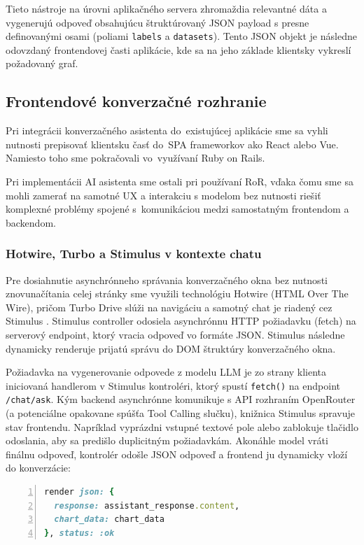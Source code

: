 Tieto nástroje na úrovni aplikačného servera zhromaždia relevantné dáta a vygenerujú
odpoveď obsahujúcu štruktúrovaný JSON payload s presne definovanými osami (poliami
\texttt{labels} a \texttt{datasets}). Tento JSON objekt je následne odovzdaný
frontendovej časti aplikácie, kde sa na jeho základe klientsky vykreslí požadovaný
graf.

\subsection{Frontendové konverzačné rozhranie}
Pri integrácii konverzačného asistenta do~existujúcej aplikácie sme sa vyhli nutnosti
prepisovať klientsku časť do~SPA frameworkov ako React alebo Vue. Namiesto toho
sme pokračovali vo~využívaní Ruby on Rails.

Pri implementácii AI asistenta sme ostali pri používaní RoR, vďaka čomu sme sa mohli
zamerať na samotné UX a interakciu s modelom bez nutnosti riešiť komplexné problémy
spojené s~komunikáciou medzi samostatným frontendom a backendom.

\subsubsection{Hotwire, Turbo a Stimulus v kontexte chatu}
Pre dosiahnutie asynchrónneho správania konverzačného okna bez nutnosti znovunačítania
celej stránky sme využili technológiu Hotwire (HTML Over The Wire), pričom Turbo
Drive slúži na navigáciu a samotný chat je riadený cez Stimulus \cite{ruby2025}. Stimulus
controller odosiela asynchrónnu HTTP požiadavku (fetch) na serverový endpoint,
ktorý vracia odpoveď vo formáte JSON. Stimulus následne dynamicky renderuje prijatú
správu do DOM štruktúry konverzačného okna.

Požiadavka na vygenerovanie odpovede z modelu LLM je zo strany klienta iniciovaná
handlerom v Stimulus kontroléri, ktorý spustí \texttt{fetch()} na endpoint \texttt{/chat/ask}.
Kým backend asynchrónne komunikuje s API rozhraním OpenRouter (a potenciálne
opakovane spúšťa Tool Calling slučku), knižnica Stimulus spravuje stav frontendu.
Napríklad vyprázdni vstupné textové pole alebo zablokuje tlačidlo odoslania, aby
sa predišlo duplicitným požiadavkám. Akonáhle model vráti finálnu odpoveď,
kontrolér odošle JSON odpoveď a frontend ju dynamicky vloží do konverzácie:

\vspace{1\baselineskip}
\begin{lstlisting}[language=Ruby,
    caption={Odoslanie JSON odpovede z API},
    label={lst:json_response},
    basicstyle=\ttfamily\small,
    keywordstyle=\color{blue},
    commentstyle=\color{gray},
    stringstyle=\color{red!70!black},
    numbers=left,
    numberstyle=\tiny\color{gray},
    breaklines=true,
    frame=single
]
render json: {
  response: assistant_response.content,
  chart_data: chart_data
}, status: :ok
\end{lstlisting}

